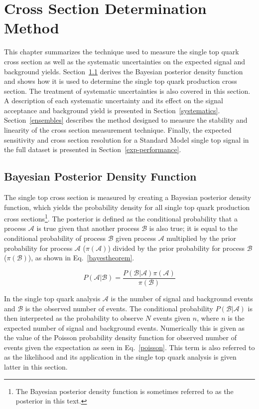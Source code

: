 \chapter{Cross Section Determination Method}
\label{crosssectionchapter}
\label{limits}

This chapter summarizes the technique used to measure the single top quark cross section as well as the systematic uncertainties on the expected signal and background yields. Section~\ref{CrossSectionDetermination} derives the Bayesian posterior density function and shows how it is used to determine the single top quark production cross section. The treatment of systematic uncertainties is also covered in this section. A description of each systematic uncertainty and its effect on the signal acceptance and background yield is presented in Section~\ref{systematics}. Section~\ref{ensembles} describes the method designed to measure the stability and linearity of the cross section measurement technique. Finally, the expected sensitivity and cross section resolution for a Standard Model single top signal in the full dataset is presented in Section~\ref{exp-performance}.

\section{Bayesian Posterior Density Function}
\label{CrossSectionDetermination}

The single top cross section is measured by creating a Bayesian posterior density function, which yields the probability density for all single top quark production cross sections\footnote{The Bayesian posterior density function is sometimes referred to as the posterior in this text.}. The posterior is defined as the conditional probability that a process $\mathcal{A}$ is true given that another process $\mathcal{B}$ is also true; it is equal to the conditional probability of process $\mathcal{B}$ given process $\mathcal{A}$ multiplied by the prior probability for process $\mathcal{A}$ ($\pi(\mathcal{A})$) divided by the prior probability for process $\mathcal{B}$ ($\pi(\mathcal{B})$), as shown in  Eq.~\ref{bayestheorem}.

\begin{equation}
\label{bayestheorem}
P(\mathcal{A}|\mathcal{B}) = \frac{P(\mathcal{B}|\mathcal{A})\pi(\mathcal{A})}{\pi(\mathcal{B})}
\end{equation}

In the single top quark analysis $\mathcal{A}$ is the number of signal and background events and $\mathcal{B}$ is the observed number of events. The conditional probability $P(\mathcal{B}|\mathcal{A})$ is then interpreted as the probability to observe $N$ events given $n$, where $n$ is the expected number of signal and background events. Numerically this is given as the value of the Poisson probability density function for observed number of events given the expectation as seen in Eq.~\ref{poisson}. This term is also referred to as the likelihood and its application in the single top quark analysis is given latter in this section.

